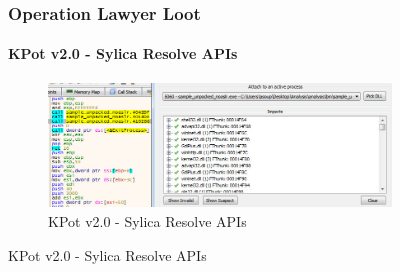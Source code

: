 \documentclass[aspectratio=169]{beamer}
\begin{document}
{
\begin{frame}
  \begin{figure}
    \frametitle{Operation Lawyer Loot}
    \framesubtitle{KPot v2.0 - Sylica Resolve APIs}
    \begin{figure}
      \includegraphics[width=12cm]{kpot-resolve-apis-sylica}
      \caption{KPot v2.0 - Sylica Resolve APIs}
    \end{figure}
  \end{figure}
\end{frame}
}
\end{document}
